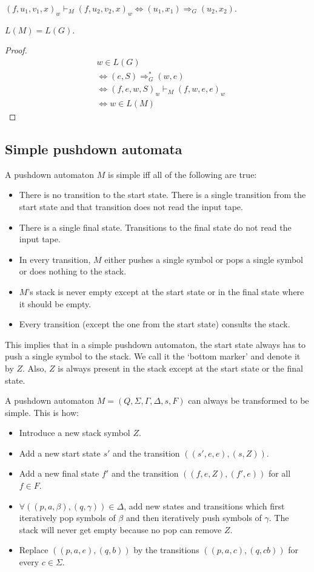 \begin{theorem}
$(f, u_1, v_1, x)_w \vdash_M (f, u_2, v_2, x)_w \iff (u_1, x_1) \Rightarrow_G (u_2, x_2)$.
\end{theorem}
\begin{theorem}$L(M) = L(G)$.\end{theorem}
\begin{proof}
\begin{align*}
& w \in L(G)
\\ &\iff (e, S) \Rightarrow_G^* (w, e)
\\ &\iff (f, e, w, S)_w \vdash_M (f, w, e, e)_w
\\ &\iff w \in L(M)
\end{align*}
\end{proof}

\subsection{Simple pushdown automata}

A pushdown automaton $M$ is simple iff all of the following are true:
\begin{itemize}
\item There is no transition to the start state.
    There is a single transition from the start state
    and that transition does not read the input tape.
\item There is a single final state.
    Transitions to the final state do not read the input tape.
\item In every transition, $M$ either pushes a single symbol or pops a single symbol or does nothing to the stack.
\item $M$'s stack is never empty except at the start state or in the final state where it should be empty.
\item Every transition (except the one from the start state) consults the stack.
\end{itemize}

This implies that in a simple pushdown automaton,
the start state always has to push a single symbol to the stack.
We call it the `bottom marker' and denote it by $Z$.
Also, $Z$ is always present in the stack except at the start state or the final state.

A pushdown automaton $M = (Q, \Sigma, \Gamma, \Delta, s, F)$
can always be transformed to be simple. This is how:
\begin{itemize}
\item Introduce a new stack symbol $Z$.
\item Add a new start state $s'$ and the transition $((s', e, e), (s, Z))$.
\item Add a new final state $f'$ and the transition $((f, e, Z), (f', e))$ for all $f \in F$.
\item $\forall ((p, a, \beta), (q, \gamma)) \in \Delta$, add new states and transitions which
    first iteratively pop symbols of $\beta$ and then iteratively push symbols of $\gamma$.
    The stack will never get empty because no pop can remove $Z$.
\item Replace $((p, a, e), (q, b))$ by the transitions $((p, a, c), (q, cb))$ for every $c \in \Sigma$.
\end{itemize}

